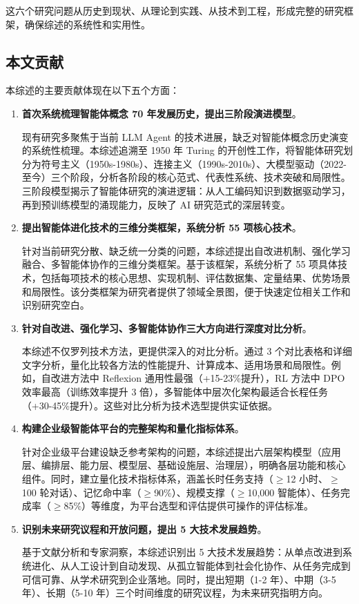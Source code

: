 \documentclass[12pt,a4paper]{article}
\begin{document}
这六个研究问题从历史到现状、从理论到实践、从技术到工程，形成完整的研究框架，确保综述的系统性和实用性。

\subsection{本文贡献}

本综述的主要贡献体现在以下五个方面：

\begin{enumerate}
    \item \textbf{首次系统梳理智能体概念 70 年发展历史，提出三阶段演进模型}。
    
    现有研究多聚焦于当前 LLM Agent 的技术进展，缺乏对智能体概念历史演变的系统性梳理。本综述追溯至 1950 年 Turing 的开创性工作，将智能体研究划分为符号主义（1950s-1980s）、连接主义（1990s-2010s）、大模型驱动（2022-至今）三个阶段，分析各阶段的核心范式、代表性系统、技术突破和局限性。三阶段模型揭示了智能体研究的演进逻辑：从人工编码知识到数据驱动学习，再到预训练模型的涌现能力，反映了 AI 研究范式的深层转变。
    
    \item \textbf{提出智能体进化技术的三维分类框架，系统分析 55 项核心技术}。
    
    针对当前研究分散、缺乏统一分类的问题，本综述提出自改进机制、强化学习融合、多智能体协作的三维分类框架。基于该框架，系统分析了 55 项具体技术，包括每项技术的核心思想、实现机制、评估数据集、定量结果、优势场景和局限性。该分类框架为研究者提供了领域全景图，便于快速定位相关工作和识别研究空白。
    
    \item \textbf{针对自改进、强化学习、多智能体协作三大方向进行深度对比分析}。
    
    本综述不仅罗列技术方法，更提供深入的对比分析。通过 3 个对比表格和详细文字分析，量化比较各方法的性能提升、计算成本、适用场景和局限性。例如，自改进方法中 Reflexion 通用性最强（+15-23\%提升），RL 方法中 DPO 效率最高（训练效率提升 3 倍），多智能体中层次化架构最适合长程任务（+30-45\%提升）。这些对比分析为技术选型提供实证依据。
    
    \item \textbf{构建企业级智能体平台的完整架构和量化指标体系}。
    
    针对企业级平台建设缺乏参考架构的问题，本综述提出六层架构模型（应用层、编排层、能力层、模型层、基础设施层、治理层），明确各层功能和核心组件。同时，建立量化技术指标体系，涵盖长时任务支持（$\geq$12 小时、$\geq$100 轮对话）、记忆命中率（$\geq$90\%）、规模支撑（$\geq$10,000 智能体）、任务完成率（$\geq$85\%）等维度，为平台选型和评估提供可操作的评估标准。
    
    \item \textbf{识别未来研究议程和开放问题，提出 5 大技术发展趋势}。
    
    基于文献分析和专家洞察，本综述识别出 5 大技术发展趋势：从单点改进到系统进化、从人工设计到自动发现、从孤立智能体到社会化协作、从任务完成到可信可靠、从学术研究到企业落地。同时，提出短期（1-2 年）、中期（3-5 年）、长期（5-10 年）三个时间维度的研究议程，为未来研究指明方向。
\end{enumerate}
\end{document}

